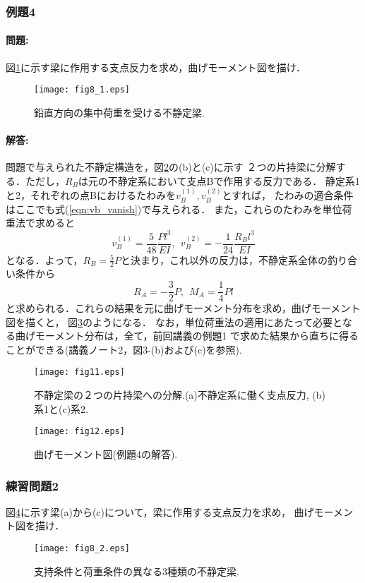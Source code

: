 ﻿\documentclass[10pt,a4j]{jarticle}
\begin{document}
\subsubsection{例題4}
\paragraph{問題:}
図\ref{fig:fig8_1}に示す梁に作用する支点反力を求め，曲げモーメント図を描け．
\begin{figure}
	\begin{center}
	\texttt{[image: fig8\_1.eps]} 
	\end{center}
	\caption{鉛直方向の集中荷重を受ける不静定梁.} 
	\label{fig:fig8_1}
\end{figure}
\paragraph{解答:}
問題で与えられた不静定構造を，図\ref{fig:fig11}の(b)と(c)に示す
２つの片持梁に分解する．ただし，$R_B$は元の不静定系において支点Bで作用する反力である．
静定系1と2，それぞれの点Bにおけるたわみを$v_B^{(1)},v_B^{(2)}$とすれば，
たわみの適合条件はここでも式(\ref{eqn:vb_vanish})で与えられる．
また，これらのたわみを単位荷重法で求めると
\begin{equation}
	v_B^{(1)}=
	\frac{5}{48} \frac{Pl^3}{EI}, \ \ 
	 v_B^{(2)}=
	-\frac{1}{24} \frac{R_Bl^3}{EI}
	\label{eqn:}
\end{equation}
となる．よって，$R_B=\frac{5}{2}P$と決まり，これ以外の反力は，不静定系全体の釣り合い条件から
\begin{equation}
	R_A=-\frac{3}{2}P, \ \ M_A=\frac{1}{4}Pl
	\label{eqn:}
\end{equation}
と求められる．これらの結果を元に曲げモーメント分布を求め，曲げモーメント図を描くと，
図\ref{fig:fig12}のようになる．
なお，単位荷重法の適用にあたって必要となる曲げモーメント分布は，全て，前回講義の例題1
で求めた結果から直ちに得ることができる(講義ノート2，図3-(b)および(c)を参照).
\begin{figure}[h]
	\begin{center}
	\texttt{[image: fig11.eps]} 
	\end{center}
	\caption{不静定梁の２つの片持梁への分解.(a)不静定系に働く支点反力, (b)系1と(c)系2.} 
	\label{fig:fig11}
\end{figure}
\begin{figure}[h]
	\begin{center}
	\texttt{[image: fig12.eps]} 
	\end{center}
	\caption{曲げモーメント図(例題4の解答).} 
	\label{fig:fig12}
\end{figure}
\subsubsection{練習問題2}
図\ref{fig:fig8_2}に示す梁(a)から(c)について，梁に作用する支点反力を求め，
曲げモーメント図を描け．
\begin{figure}
	\begin{center}
	\texttt{[image: fig8\_2.eps]} 
	\end{center}
	\caption{支持条件と荷重条件の異なる3種類の不静定梁.} 
	\label{fig:fig8_2}
\end{figure}
\end{document}
